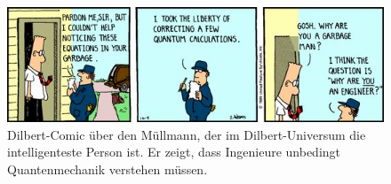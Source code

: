 %
%
%
\begin{figure}
\centering
\includegraphics[width=\textwidth]{chapters/040-felder/images/Garbageman.png}
\caption{Dilbert-Comic über den Müllmann, der im Dilbert-Universum die
intelligenteste Person ist.
Er zeigt, dass Ingenieure unbedingt Quantenmechanik verstehen müssen.
\label{buch:felder:fig:garbageman}}
\end{figure}

